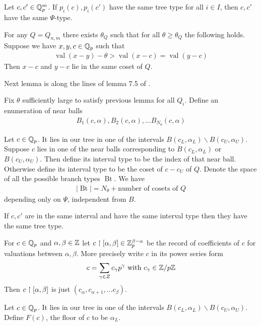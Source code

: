 \documentclass{amsart}
\DeclareMathOperator{\Bt}{Bt}
\DeclareMathOperator{\val}{val}
\begin{document}
\begin{Lemma}
	Let $c, c' \in \mathbb{Q}_p^m$.
	If $p_i(c), p_i(c')$ have the same tree type for all $i \in I$, then $c, c'$ have the same $\Psi$-type.
\end{Lemma}

\begin{Lemma}
	For any $Q = Q_{n,m}$ there exists $\theta_Q$ such that for all $\theta \geq \theta_Q$ the following holds.
	Suppose we have $x,y,c \in \mathbb{Q}_p$ such that
	\begin{align*}
		\val(x-y) - \theta > \val(x-c) = \val(y-c)
	\end{align*}
	Then $x-c$ and $y-c$ lie in the same coset of $Q$.
\end{Lemma}


Next lemma is along the lines of lemma 7.5 of \cite{density}.

\begin{Lemma}
	Fix $\theta$ sufficiently large to satisfy previous lemma for all $Q_i$. Define an enumeration of near balls
	\begin{align*}
		B_1(c, \alpha), B_2(c, \alpha), \ldots B_{N_\theta}(c, \alpha)
	\end{align*}
\end{Lemma}

\begin{Definition}
	Let $c \in \mathbb{Q}_p$.
	It lies in our tree in one of the intervals $B(c_L, \alpha_L) \backslash B(c_U, \alpha_U)$.
	Suppose $c$ lies in one of the near balls corresponding to $B(c_L, \alpha_L)$ or $B(c_U, \alpha_U)$.
	Then define its interval type to be the index of that near ball.
	Otherwise define its interval type to be the coset of $c - c_U$ of $Q$.
	Denote the space of all the possible branch types $\Bt$.
	We have
	\begin{align*}
		|\Bt| = N_\theta + \text {number of cosets of $Q$}
	\end{align*}
	depending only on $\Psi$, independent from $B$.
	
\end{Definition}

\begin{Lemma}
	If $c, c'$ are in the same interval and have the same interval type then they have the same tree type.
\end{Lemma}

\begin{Definition}
	For $c \in \mathbb{Q}_p$ and $\alpha, \beta \in \mathbb{Z}$ let $c \upharpoonright [\alpha, \beta] \in \mathbb{Z}_p^{\beta - \alpha}$ be the record of coefficients of $c$ for valuations between $\alpha, \beta$. More precisely write $c$ in its power series form
	\begin{align*}
		c = \sum_{\gamma \in Z} c_\gamma p^\gamma \text{ with } c_\gamma \in \mathbb{Z}/p\mathbb{Z}
	\end{align*}
	Then $c \upharpoonright [\alpha, \beta]$ is just $(c_\alpha, c_{\alpha+1}, \ldots c_\beta)$.
\end{Definition}
\begin{Definition}
	Let $c \in \mathbb{Q}_p$.
	It lies in our tree in one of the intervals $B(c_L, \alpha_L) \backslash B(c_U, \alpha_U)$.
	Define $F(c)$, the floor of $c$ to be $\alpha_L$.
\end{Definition}
\end{document}
